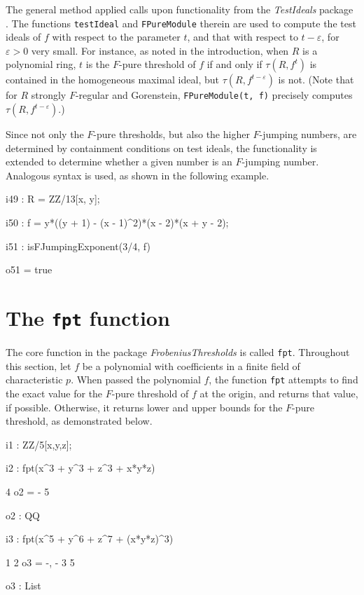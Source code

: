 \documentclass{amsart}
\begin{document}
The general method applied calls upon functionality from the \emph{TestIdeals} package \cite{TestIdealsPackage, TestIdealsPaper}.  The functions {\tt testIdeal} and {\tt FPureModule} therein are used
to compute the test ideals of $f$ with respect to the parameter $t$, and that with respect to $t - \varepsilon$, for $\varepsilon>0$ very small. For instance, as noted in the introduction, when $R$ is a polynomial ring, $t$ is the $F$-pure threshold of $f$ if and only if $\tau(R, f^t)$ is contained in the homogeneous maximal ideal, but
$\tau(R, f^{t-\varepsilon})$ is not.
(Note that for $R$ strongly $F$-regular and Gorenstein, {\tt FPureModule(t, f)} precisely computes $\tau(R, f^{t-\varepsilon})$.)

Since not only the $F$-pure thresholds, but also the higher $F$-jumping numbers, are determined by containment conditions on test ideals, the functionality is extended to determine whether a given number is an $F$-jumping number.
Analogous syntax is used, as shown in the following example.

{\small
{}
\begin{MyVerbatim}

i49 : R = ZZ/13[x, y];

i50 : f = y*((y + 1) - (x - 1)^2)*(x - 2)*(x + y - 2);

i51 : isFJumpingExponent(3/4, f)

o51 = true
\end{MyVerbatim}
}
\medspace

\section{The {\tt fpt} function}
\label{sec.FPT}

The core function in the package \emph{FrobeniusThresholds} is called {\tt fpt}.  Throughout this section, let $f$ be a polynomial with coefficients in a finite field of characteristic $p$. When passed the polynomial $f$, the function {\tt fpt} attempts to find the exact value for the $F$-pure threshold of $f$ at the origin, and returns that value, if possible.  Otherwise, it returns lower and upper bounds for the $F$-pure threshold, as demonstrated below.

{\small
{}
\begin{MyVerbatim}

i1 : ZZ/5[x,y,z];

i2 : fpt(x^3 + y^3 + z^3 + x*y*z)

     4
o2 = -
     5

o2 : QQ

i3 : fpt(x^5 + y^6 + z^7 + (x*y*z)^3)

      1  2
o3 = {-, -}
      3  5

o3 : List
\end{MyVerbatim}
}
\medspace
\end{document}

